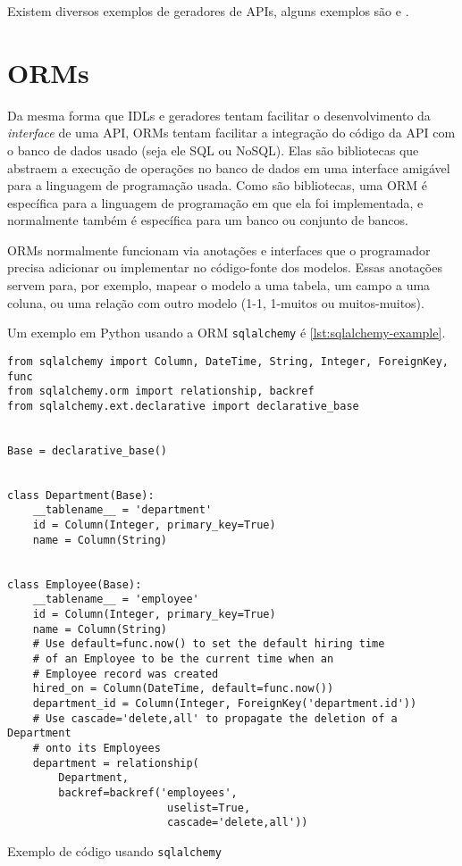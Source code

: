 Existem diversos exemplos de geradores de APIs, alguns exemplos são \cite{openapi:gen}
e \cite{googl:protoc}.

\section{ORMs}

Da mesma forma que IDLs e geradores tentam facilitar o desenvolvimento da
\textit{interface} de uma API, ORMs tentam facilitar a integração do código da
API com o banco de dados usado (seja ele SQL ou NoSQL). Elas são bibliotecas que
abstraem a execução de operações no banco de dados em uma interface amigável para
a linguagem de programação usada. Como são bibliotecas, uma ORM é específica para
a linguagem de programação em que ela foi implementada, e normalmente também é
específica para um banco ou conjunto de bancos.

ORMs normalmente funcionam via anotações e interfaces que o programador precisa
adicionar ou implementar no código-fonte dos modelos. Essas anotações servem para,
por exemplo, mapear o modelo a uma tabela, um campo a uma coluna, ou uma relação
com outro modelo (1-1, 1-muitos ou muitos-muitos).

Um exemplo em Python usando a ORM \texttt{sqlalchemy} é \cref{lst:sqlalchemy-example}.

\begin{listing}[ht]
\begin{verbatim}
from sqlalchemy import Column, DateTime, String, Integer, ForeignKey, func
from sqlalchemy.orm import relationship, backref
from sqlalchemy.ext.declarative import declarative_base


Base = declarative_base()


class Department(Base):
    __tablename__ = 'department'
    id = Column(Integer, primary_key=True)
    name = Column(String)


class Employee(Base):
    __tablename__ = 'employee'
    id = Column(Integer, primary_key=True)
    name = Column(String)
    # Use default=func.now() to set the default hiring time
    # of an Employee to be the current time when an
    # Employee record was created
    hired_on = Column(DateTime, default=func.now())
    department_id = Column(Integer, ForeignKey('department.id'))
    # Use cascade='delete,all' to propagate the deletion of a Department
    # onto its Employees
    department = relationship(
        Department,
        backref=backref('employees',
                         uselist=True,
                         cascade='delete,all'))

\end{verbatim}
\caption{Exemplo de código usando \texttt{sqlalchemy}}
\label{lst:sqlalchemy-example}
\end{listing}

